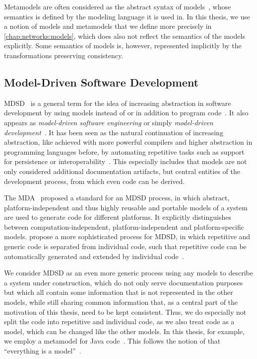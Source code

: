 Metamodels are often considered as the abstract syntax of models~\cite[p.~27]{voelter2013DslEngineering}, whose semantics is defined by the modeling language it is used in.
In this thesis, we use a notion of models and metamodels that we define more precisely in \autoref{chap:networks:models}, which does also not reflect the semantics of the models explicitly.
Some semantics of models is, however, represented implicitly by the transformations preserving consistency.


\subsection{Model-Driven Software Development}
\label{chap:foundations:modeling:mdsd}

\gls{MDSD}~\cite{stahl2006mdsd-Book} is a general term for the idea of increasing abstraction in software development by using models instead of or in addition to program code~\cite{atkinson2003mdd-Software}.
It also appears as \emph{model-driven software engineering} or simply \emph{model-driven development}~\cite{atkinson2003mdd-Software}.
It has been seen as the natural continuation of increasing abstraction, like achieved with more powerful compilers and higher abstraction in programming languages before, by automating repetitive tasks such as support for persistence or interoperability~\cite{atkinson2003mdd-Software}.
This especially includes that models are not only considered additional documentation artifacts, but central entities of the development process, from which even code can be derived.

The \gls{MDA}~\cite{mda} proposed a standard for an \gls{MDSD} process, in which abstract, platform-independent and thus highly reusable and portable models of a system are used to generate code for different platforms.
It explicitly distinguishes between computation-independent, platform-independent and platform-specific models.
\citeauthor{stahl2006mdsd-Book} propose a more sophisticated process for \gls{MDSD}, in which repetitive and generic code is separated from individual code, such that repetitive code can be automatically generated and extended by individual code~\cite[Fig.~2.1]{stahl2006mdsd-Book}.

We consider \gls{MDSD} as an even more generic process using any models to describe a system under construction, which do not only serve documentation purposes but which all contain some information that is not represented in the other models, while still sharing common information that, as a central part of the motivation of this thesis, need to be kept consistent.
Thus, we do especially not split the code into repetitive and individual code, as we also treat code as a model, which can be changed like the other models.
In this thesis, for example, we employ a metamodel for Java code~\cite{heidenreich2010jamopp-SLE}.
This follows the notion of \citeauthor{bezivin2005sosym} that \enquote{everything is a model}~\cite{bezivin2005sosym}.



